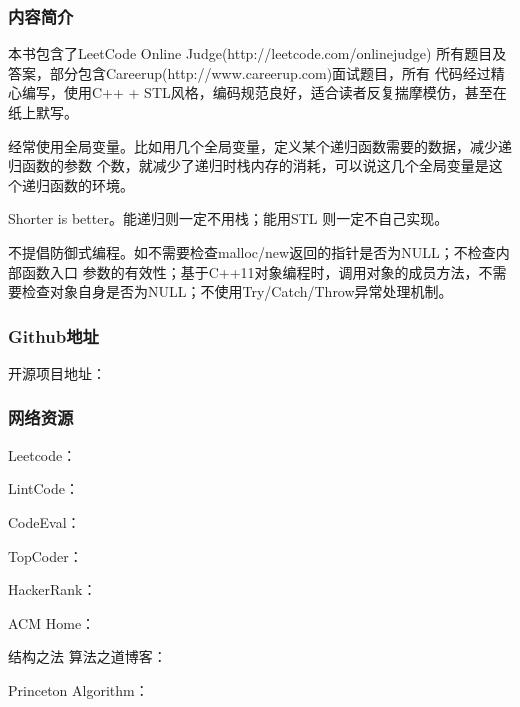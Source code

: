 \subsubsection{内容简介}

本书包含了LeetCode Online Judge(http://leetcode.com/onlinejudge) 
所有题目及答案，部分包含Careerup(http://www.careerup.com)面试题目，所有
代码经过精心编写，使用C++ + STL风格，编码规范良好，适合读者反复揣摩模仿，甚至在纸上默写。

\begindot
\item 经常使用全局变量。比如用几个全局变量，定义某个递归函数需要的数据，减少递归函数的参数
个数，就减少了递归时栈内存的消耗，可以说这几个全局变量是这个递归函数的环境。

\item Shorter is better。能递归则一定不用栈；能用STL 则一定不自己实现。

\item 不提倡防御式编程。如不需要检查malloc/new返回的指针是否为NULL；不检查内部函数入口
参数的有效性；基于C++11对象编程时，调用对象的成员方法，不需要检查对象自身是否为NULL；不使用Try/Catch/Throw异常处理机制。
\myenddot

\subsubsection{Github地址}
开源项目地址：

\subsubsection{网络资源}
\begindot
\item Leetcode：
\item LintCode：
\item CodeEval：
\item TopCoder：
\item HackerRank：
\item ACM Home：
\item 结构之法 算法之道博客：
\item Princeton Algorithm：
\myenddot

